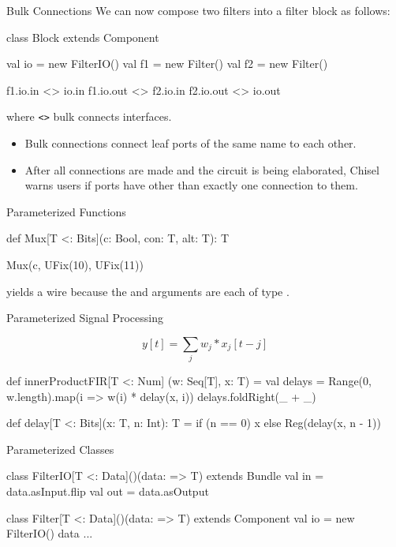 \documentclass[xcolor=pdflatex,dvipsnames,table]{beamer}
\begin{document}
\begin{frame}[fragile]{Bulk Connections}
We can now compose two filters into a filter block as follows:

\begin{scala}
class Block extends Component { 
  val io = new FilterIO()
  val f1 = new Filter()
  val f2 = new Filter()

  f1.io.in  <> io.in
  f1.io.out <> f2.io.in
  f2.io.out <> io.out
}
\end{scala}

\noindent
where \verb+<>+ bulk connects interfaces.
\begin{itemize}
\item Bulk connections connect leaf ports of the same name to each other.
\item After all connections are made and the circuit is being elaborated,
Chisel warns users if ports have other than exactly one connection to them.
\end{itemize}

\end{frame}

\begin{frame}[fragile]{Parameterized Functions}
\begin{scala}
def Mux[T <: Bits](c: Bool, con: T, alt: T): T

Mux(c, UFix(10), UFix(11))
\end{scala}

\noindent
yields a  wire because the  and 
arguments are each of type .
\end{frame}

\begin{frame}[fragile]{Parameterized Signal Processing}

\begin{equation}
y[t] = \sum_j w_j * x_j[t-j]
\end{equation}

\begin{scala}
def innerProductFIR[T <: Num] (w: Seq[T], x: T) = {
  val delays = Range(0, w.length).map(i => w(i) * delay(x, i))
  delays.foldRight(_ + _)
}

def delay[T <: Bits](x: T, n: Int): T =
  if (n == 0) x else Reg(delay(x, n - 1))
\end{scala}

\end{frame}

\begin{frame}[fragile]{Parameterized Classes}
\begin{scala}
class FilterIO[T <: Data]()(data: => T) extends Bundle { 
  val in  = data.asInput.flip
  val out = data.asOutput
}

class Filter[T <: Data]()(data: => T) extends Component { 
  val io = new FilterIO(){ data }
  ...
}
\end{scala}
\end{frame}
\end{document}
